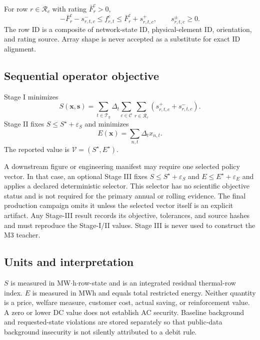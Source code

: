 \documentclass[10pt,journal,onecolumn]{IEEEtran}
\newcommand{\eps}{\varepsilon}
\begin{document}
For row $r\in\mathcal R_c$ with rating $\bar F_r^c>0$,
\begin{equation}
-\bar F_r^c-s_{r,t,c}^{-}
\leq f_{r,t}^c
\leq\bar F_r^c+s_{r,t,c}^{+},
\qquad s_{r,t,c}^{\pm}\geq0.
\label{eq:report_rows}
\end{equation}
The row ID is a composite of network-state ID, physical-element ID,
orientation, and rating source. Array shape is never accepted as a substitute
for exact ID alignment.

\subsection{Sequential operator objective}

Stage I minimizes
\begin{equation}
S(\bm x,\bm s)
=\sum_{t\in\mathcal T_y}\Delta_t
\sum_{c\in\mathcal C}\sum_{r\in\mathcal R_c}
(s_{r,t,c}^{+}+s_{r,t,c}^{-}).
\label{eq:report_S}
\end{equation}
Stage II fixes
$S\leq S^{\star}+\eps_S$ and minimizes
\begin{equation}
E(\bm x)=\sum_{n,t}\Delta_tx_{n,t}.
\label{eq:report_E}
\end{equation}
The reported value is $\mathcal V=(S^{\star},E^{\star})$.

A downstream figure or engineering manifest may require one selected policy
vector. In that case, an optional Stage III fixes
$S\leq S^{\star}+\eps_S$ and $E\leq E^{\star}+\eps_E$ and applies a declared
deterministic selector. This selector has no scientific objective status and is
not required for the primary annual or rolling evidence. The final production
campaign omits it unless the selected vector itself is an explicit artifact.
Any Stage-III result records its objective, tolerances, and source hashes and
must reproduce the Stage-I/II values. Stage III is never used to construct the
M3 teacher.

\subsection{Units and interpretation}

$S$ is measured in MW$\cdot$h$\cdot$row-state and is an integrated residual
thermal-row index. $E$ is measured in MWh and equals total restricted energy.
Neither quantity is a price, welfare measure, customer cost, actual saving, or
reinforcement value. A zero or lower DC value does not establish AC security.
Baseline background and requested-state violations are stored separately so
that public-data background insecurity is not silently attributed to a debit
rule.
\end{document}
